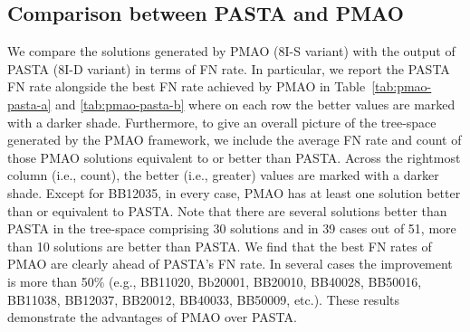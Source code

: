 \documentclass[a4paper,fleqn, review]{cas-dc}
\begin{document}
\subsection{Comparison between PASTA and PMAO}
We compare the solutions generated by PMAO (8I-S variant) with the output of PASTA (8I-D variant) in terms of FN rate. In particular, we report the PASTA FN rate alongside the best FN rate achieved by PMAO in Table~\ref{tab:pmao-pasta-a} and \ref{tab:pmao-pasta-b} where on each row the better values are marked with a darker shade. Furthermore, to give an overall picture of the tree-space generated by the PMAO framework, we include the average FN rate and count of those PMAO solutions equivalent to or better than PASTA. Across the rightmost column (i.e., count), the better (i.e., greater) values are marked with a darker shade. Except for BB12035, in every case, PMAO has at least one solution better than or equivalent to PASTA. Note that there are several solutions better than PASTA in the tree-space comprising 30 solutions and in 39 cases out of 51, more than 10 solutions are better than PASTA. We find that the best FN rates of PMAO are clearly ahead of PASTA's FN rate. In several cases the improvement is more than 50\% (e.g., BB11020, Bb20001, BB20010, BB40028, BB50016, BB11038, BB12037, BB20012, BB40033, BB50009, etc.). These results demonstrate the advantages of PMAO over PASTA.
\end{document}
